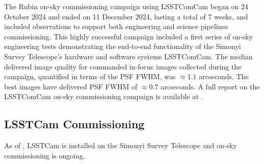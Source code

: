 The Rubin on-sky commissioning campaign using  LSSTComCam began on 24 October 2024 and ended on 11 December 2024, lasting a total of 7 weeks, and included observations to support both engineering and science pipelines commissioning.
This highly successful campaign included a first series of on-sky engineering tests demonstrating the end-to-end functionality of the Simonyi Survey Telescope’s hardware and software systems  LSSTComCam.
The median delivered image quality for commanded in-focus images collected during the campaign, quantified in terms of the PSF FWHM, was $\approx1.1$ arcseconds. 
The best images have delivered PSF FWHM of $\approx0.7$ arcseconds.
A full report on the  LSSTComCam on-sky commissioning campaign is available at .


\subsection{LSSTCam Commissioning}
\label{ssec:commissioning-lsstcam}

As of \currentdate, LSSTCam is installed on  the Simonyi Survey Telescope and on-sky commissioning is ongoing. 

